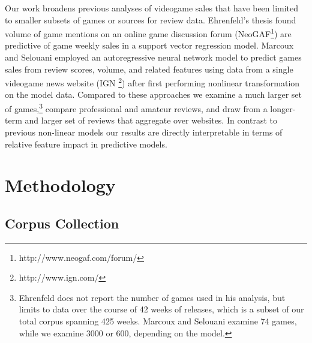 \documentclass[letterpaper]{article}
\begin{document}
Our work broadens previous analyses of videogame sales that have been limited to smaller subsets of games or sources for review data. Ehrenfeld's thesis found volume of game mentions on an online game discussion forum (NeoGAF\footnote{http://www.neogaf.com/forum/}) are predictive of game weekly sales in a support vector regression model. Marcoux and Selouani employed an autoregressive neural network model to predict games sales from review scores, volume, and related features using data from a single videogame news website (IGN \footnote{http://www.ign.com/}) after first performing nonlinear transformation on the model data. Compared to these approaches we examine a much larger set of games,\footnote{Ehrenfeld does not report the number of games used in his analysis, but limits to data over the course of 42 weeks of releases, which is a subset of our total corpus spanning 425 weeks. Marcoux and Selouani examine 74 games, while we examine 3000 or 600, depending on the model.} compare professional and amateur reviews, and draw from a longer-term and larger set of reviews that aggregate over websites. In contrast to previous non-linear models our results are directly interpretable in terms of relative feature impact in predictive models.


\section{Methodology}

\subsection{Corpus Collection}
\end{document}
